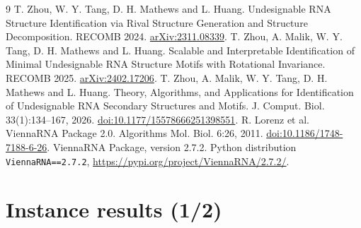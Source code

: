 \documentclass[10pt,a4paper]{article}
\begin{document}
\begin{thebibliography}{9}\small
{} T. Zhou, W. Y. Tang, D. H. Mathews and L. Huang.
Undesignable RNA Structure Identification via Rival Structure Generation and Structure Decomposition. RECOMB 2024. \href{https://arxiv.org/abs/2311.08339}{arXiv:2311.08339}.
 T. Zhou, A. Malik, W. Y. Tang, D. H. Mathews and L. Huang.
Scalable and Interpretable Identification of Minimal Undesignable RNA Structure Motifs with Rotational Invariance. RECOMB 2025. \href{https://arxiv.org/abs/2402.17206}{arXiv:2402.17206}.
 T. Zhou, A. Malik, W. Y. Tang, D. H. Mathews and L. Huang.
Theory, Algorithms, and Applications for Identification of Undesignable RNA Secondary Structures and Motifs. J. Comput. Biol. 33(1):134--167, 2026. \href{https://doi.org/10.1177/15578666251398551}{doi:10.1177/15578666251398551}.
 R. Lorenz et al. ViennaRNA Package 2.0. Algorithms Mol. Biol. 6:26, 2011. \href{https://doi.org/10.1186/1748-7188-6-26}{doi:10.1186/1748-7188-6-26}.
 ViennaRNA Package, version 2.7.2. Python distribution \texttt{ViennaRNA==2.7.2}, \url{https://pypi.org/project/ViennaRNA/2.7.2/}.
\end{thebibliography}
\newpage\section*{Instance results (1/2)}
\end{document}
